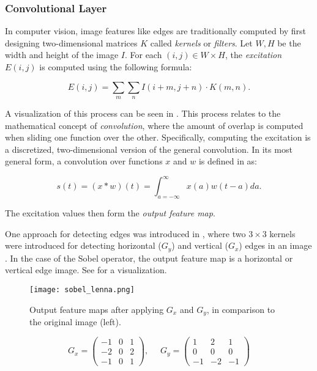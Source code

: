 \subsubsection{Convolutional Layer}

In computer vision, image features like edges are traditionally computed by first designing two-dimensional matrices $K$ called \textit{kernels} or \textit{filters}.
Let $W, H$ be the width and height of the image $I$.
For each $(i,j) \in W \times H$, the \textit{excitation} $E(i,j)$ is computed using the following formula:

\begin{equation}
    E(i,j) = \sum_m \sum_n I(i + m,j + n) \cdot K(m, n).
\end{equation}

A visualization of this process can be seen in .
This process relates to the mathematical concept of \textit{convolution}, where the amount of overlap is computed when sliding one function over the other.
Specifically, computing the excitation is a discretized, two-dimensional version of the general convolution.
In its most general form, a convolution over functions $x$ and $w$ is defined in \cite{goodfellow_deep_2016} as:

\begin{equation}
    s(t) = (x * w)(t) = \int_{a=-\infty}^{\infty} x(a)w(t-a)  da.
\end{equation}

The excitation values then form the \textit{output feature map}.

One approach for detecting edges was introduced in \cite{sobel_3x3_1968}, where two $3 \times 3$ kernels were introduced for detecting horizontal ($G_y$) and vertical ($G_x$) edges in an image .
In the case of the Sobel operator, the output feature map is a horizontal or vertical edge image.
See  for a visualization.

\begin{figure}[htb!]
    \centering
    \texttt{[image: sobel\_lenna.png]}
    \caption{Output feature maps after applying $G_x$ and $G_y$, in comparison to the original image (left).}
    \label{fig:sobel_lenna}
\end{figure}

\begin{equation}
    \label{eq:sobel}
    G_x = 
    \begin{pmatrix}
        -1 & 0 & 1 \\
        -2 & 0 & 2 \\
        -1 & 0 & 1 
    \end{pmatrix}
    ,~~~~~~
    G_y = 
    \begin{pmatrix}
        1 & 2 & 1 \\
        0 & 0 & 0 \\
        -1 & -2 & -1
    \end{pmatrix}
\end{equation}

